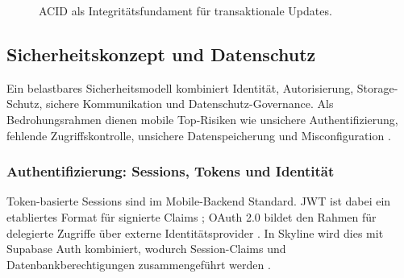 \begin{figure}[H]
  \centering
  \caption{ACID als Integritätsfundament für transaktionale Updates.}
  \label{fig:acid_foundation}
\end{figure}

\subsection{Sicherheitskonzept und Datenschutz}
Ein belastbares Sicherheitsmodell kombiniert Identität, Autorisierung,
Storage-Schutz, sichere Kommunikation und Datenschutz-Governance. Als
Bedrohungsrahmen dienen mobile Top-Risiken wie unsichere Authentifizierung,
fehlende Zugriffskontrolle, unsichere Datenspeicherung und Misconfiguration
\cite{owaspMobileTop10}.

\subsubsection{Authentifizierung: Sessions, Tokens und Identität}
Token-basierte Sessions sind im Mobile-Backend Standard. JWT ist dabei ein
etabliertes Format für signierte Claims \cite{rfc7519}; OAuth 2.0 bildet den
Rahmen für delegierte Zugriffe über externe Identitätsprovider
\cite{rfc6749}. In Skyline wird dies mit Supabase Auth kombiniert, wodurch
Session-Claims und Datenbankberechtigungen zusammengeführt werden
\cite{supabaseAuth,supabaseRLS}.

